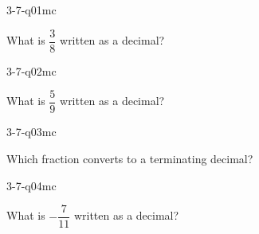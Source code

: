 

\begin{practiceQuestion}{3-7-q01}{mc}
\begin{questionText}
What is $\dfrac{3}{8}$ written as a decimal?
\end{questionText}
\end{practiceQuestion}

\begin{practiceQuestion}{3-7-q02}{mc}
\begin{questionText}
What is $\dfrac{5}{9}$ written as a decimal?
\end{questionText}
\end{practiceQuestion}

\begin{practiceQuestion}{3-7-q03}{mc}
\begin{questionText}
Which fraction converts to a terminating decimal?
\end{questionText}
\end{practiceQuestion}

\begin{practiceQuestion}{3-7-q04}{mc}
\begin{questionText}
What is $-\dfrac{7}{11}$ written as a decimal?
\end{questionText}
\end{practiceQuestion}

